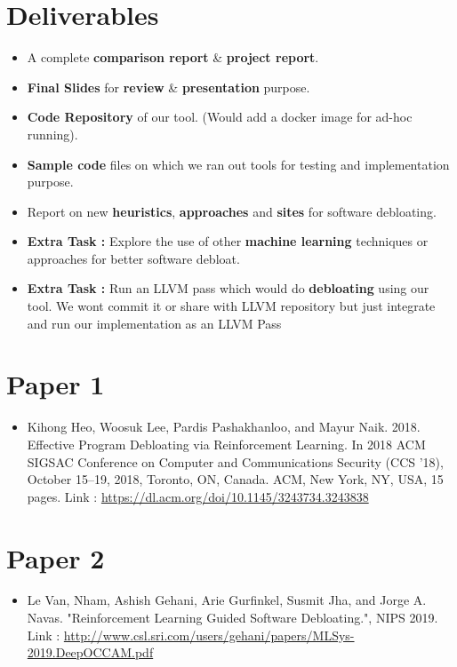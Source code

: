 \documentclass{article} %
\begin{document}
\section*{Deliverables} 
    \begin{itemize}
        \item A complete \textbf{comparison report} \& \textbf{project report}.
        \item \textbf{Final Slides} for \textbf{review} \& \textbf{presentation} purpose.
        \item \textbf{Code Repository} of our tool. (Would add a docker image for ad-hoc running).
        \item \textbf{Sample code} files on which we ran out tools for testing and implementation purpose.  
        \item Report on new \textbf{heuristics}, \textbf{approaches} and \textbf{sites} for software debloating.  
        \item \textbf{Extra Task :} Explore the use of other \textbf{machine learning} techniques or approaches for better software debloat.
        \item \textbf{Extra Task :} Run an LLVM pass which would do \textbf{debloating} using our tool. \color{blue} We wont commit it or share with LLVM repository but just integrate and run our implementation as an LLVM Pass \color{black}  
    \end{itemize}

\section*{Paper 1} \label{second}
\begin{itemize}
    \item \color{blue} Kihong Heo, Woosuk Lee, Pardis Pashakhanloo, and Mayur Naik. 2018.
    Effective Program Debloating via Reinforcement Learning. In 2018 ACM
    SIGSAC Conference on Computer and Communications Security (CCS ’18), October
    15–19, 2018, Toronto, ON, Canada. ACM, New York, NY, USA, 15 pages. \color{black} Link :
    \url{https://dl.acm.org/doi/10.1145/3243734.3243838}
\end{itemize}

\section*{Paper 2}
\begin{itemize}
    \item \color{blue} Le Van, Nham, Ashish Gehani, Arie Gurfinkel, Susmit Jha, and Jorge A. Navas. "Reinforcement Learning Guided Software Debloating.", NIPS 2019. \color{black} Link : \url{http://www.csl.sri.com/users/gehani/papers/MLSys-2019.DeepOCCAM.pdf} 
\end{itemize}
\end{document}

